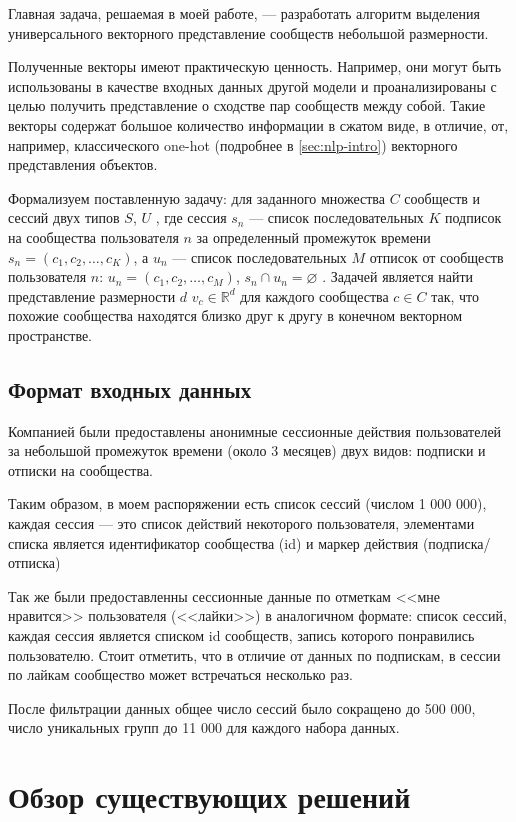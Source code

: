 \documentclass[times,specification,annotation]{itmo-student-thesis}
\begin{document}
Главная задача, решаемая в моей работе, --- разработать алгоритм выделения универсального векторного представление сообществ небольшой размерности. 

Полученные векторы имеют практическую ценность. Например, они могут быть использованы в
качестве входных данных другой модели и проанализированы с целью
получить представление о сходстве пар сообществ между собой. Такие векторы содержат большое количество информации в сжатом виде, в отличие, от, например, классического one-hot (подробнее в \ref{sec:nlp-intro}) векторного представления объектов.

Формализуем поставленную задачу: для заданного множества $C$ сообществ и сессий двух типов $S$, $U$ , где сессия $s_n$ --- список последовательных $K$ подписок на сообщества пользователя $n$ за определенный промежуток времени $s_n = (c_{1}, c_{2}, \dots, c_{K})$, а $u_n$ --- список последовательных $M$ отписок от сообществ пользователя $n$: $u_n = (c_{1},  c_{2}, \dots, c_{M})$, $s_n \cap u_n = \varnothing$ .  
Задачей является найти представление размерности $d$ $v_{c} \in \mathbb{R}^d$ для каждого сообщества $c \in C$ так, что похожие сообщества находятся близко друг к другу в конечном векторном пространстве. 

\subsection{Формат входных данных}

Компанией были предоставлены анонимные сессионные действия пользователей за небольшой промежуток времени (около 3 месяцев) двух видов: подписки и отписки на сообщества.

Таким образом, в моем распоряжении есть список сессий (числом 1 000 000), каждая сессия --- это список действий некоторого пользователя, элементами списка является идентификатор сообщества (id) и маркер действия (подписка/отписка)

Так же были предоставленны сессионные данные по отметкам <<мне нравится>> пользователя (<<лайки>>) в аналогичном формате: список сессий, каждая сессия является списком id сообществ, запись которого понравились пользователю. Стоит отметить, что в отличие от данных по подпискам, в сессии по лайкам сообщество может встречаться несколько раз.

После фильтрации данных общее число сессий было сокращено до 500 000, число уникальных групп до 11 000 для каждого набора данных.   

\section{Обзор существующих решений}
\end{document}

